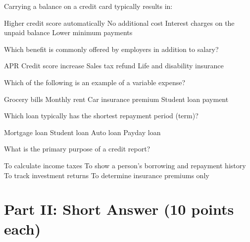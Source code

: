 \documentclass[12pt]{exam}
\begin{document}
\begin{questions}
  \begin{mcquestion}[2]
    Carrying a balance on a credit card typically results in:
    \begin{choices}
      \choice Higher credit score automatically
      \choice No additional cost
      \CorrectChoice Interest charges on the unpaid balance
      \choice Lower minimum payments
    \end{choices}
  \end{mcquestion}

  \begin{mcquestion}[2]
    Which benefit is commonly offered by employers in addition to salary?
    \begin{choices}
      \choice APR
      \choice Credit score increase
      \choice Sales tax refund
      \CorrectChoice Life and disability insurance
    \end{choices}
  \end{mcquestion}

  \begin{mcquestion}[2]
    Which of the following is an example of a variable expense?
    \begin{choices}
      \CorrectChoice Grocery bills
      \choice Monthly rent
      \choice Car insurance premium
      \choice Student loan payment
    \end{choices}
  \end{mcquestion}

  \begin{mcquestion}[2]
    Which loan typically has the shortest repayment period (term)?
    \begin{choices}
      \choice Mortgage loan
      \choice Student loan
      \choice Auto loan
      \CorrectChoice Payday loan
    \end{choices}
  \end{mcquestion}

  \begin{mcquestion}[2]
    What is the primary purpose of a credit report?
    \begin{choices}
      \choice To calculate income taxes
      \CorrectChoice To show a person's borrowing and repayment history
      \choice To track investment returns
      \choice To determine insurance premiums only
    \end{choices}
  \end{mcquestion}

  \section*{Part II: Short Answer (10 points each)}


\end{questions}
\end{document}
